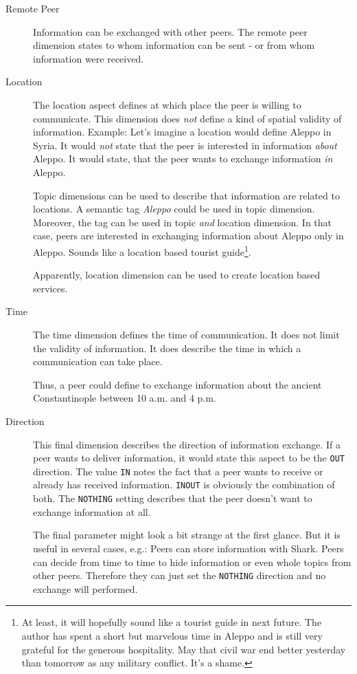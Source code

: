 \begin{description}
    \item[Remote Peer] Information can be exchanged with other peers. The remote peer dimension states to whom information can be sent - or from whom information were received.

    \item[Location] 
The location aspect defines at which place the peer is willing to communicate. This dimension does {\it not} define a kind of spatial validity of information. Example: Let's imagine a location would define Aleppo in Syria. It would {\it not} state that the peer is interested in information {\it about} Aleppo. It would state, that the peer wants to exchange information {\it in} Aleppo.

Topic dimensions can be used to describe that information are related to locations. A semantic tag {\it Aleppo} could be used in topic dimension. Moreover, the tag can be used in topic {\it and} location dimension. In that case, peers are interested in exchanging information about Aleppo only in Aleppo. Sounds like a location based tourist guide\footnote{At least, it will hopefully sound like a tourist guide in next future. The author has spent a short but marvelous time in Aleppo and is still very grateful for the generous hospitality. May that civil war end better yesterday than tomorrow as any military conflict. It's a shame.}.

Apparently, location dimension can be used to create location based services.

    \item[Time] 
The time dimension defines the time of communication. It does not limit the validity of information. It does describe the time in which a communication can take place.

Thus, a peer could define to exchange information about the ancient Constantinople between 10 a.m. and 4 p.m.

    \item[Direction] 
This final dimension describes the direction of information exchange. If a peer wants to deliver information, it would state this aspect to be the {\tt OUT} direction. The value {\tt IN} notes the fact that a peer wants to receive or already has received information. {\tt INOUT} is obviously the combination of both. The {\tt NOTHING} setting describes that the peer doesn't want to exchange information at all.

The final parameter might look a bit strange at the first glance. But it is useful in several cases, e.g.: Peers can store information with Shark. Peers can decide from time to time to hide information or even whole topics from other peers. Therefore they can just set the {\tt NOTHING} direction and no exchange will performed.

\end{description}

